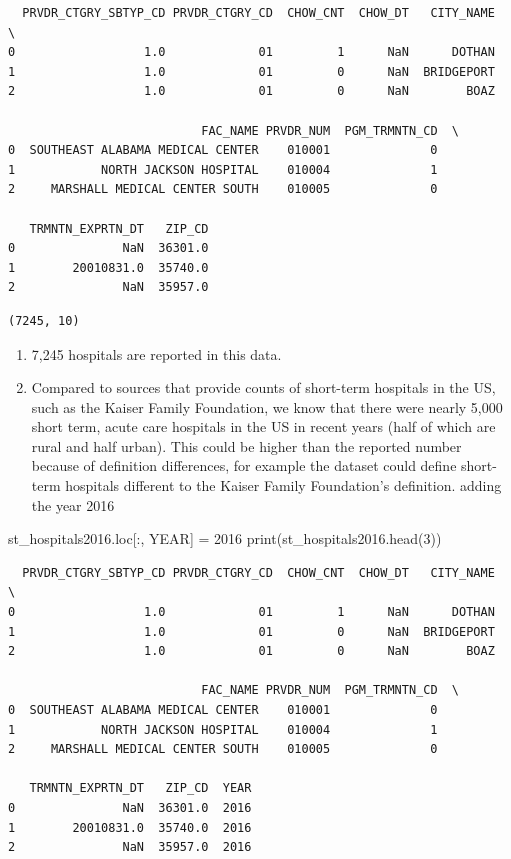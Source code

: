 \documentclass[
  letterpaper,
  DIV=11,
  numbers=noendperiod]{scrartcl}
\newenvironment{Shaded}{\begin{snugshade}}{\end{snugshade}}
\newcommand{\BuiltInTok}[1]{\textcolor[rgb]{0.00,0.23,0.31}{#1}}
\newcommand{\DecValTok}[1]{\textcolor[rgb]{0.68,0.00,0.00}{#1}}
\newcommand{\NormalTok}[1]{\textcolor[rgb]{0.00,0.23,0.31}{#1}}
\newcommand{\OperatorTok}[1]{\textcolor[rgb]{0.37,0.37,0.37}{#1}}
\newcommand{\StringTok}[1]{\textcolor[rgb]{0.13,0.47,0.30}{#1}}
\providecommand{\tightlist}{%
  \setlength{\itemsep}{0pt}\setlength{\parskip}{0pt}}\usepackage{longtable,booktabs,array}
\begin{document}
\begin{verbatim}
  PRVDR_CTGRY_SBTYP_CD PRVDR_CTGRY_CD  CHOW_CNT  CHOW_DT   CITY_NAME  \
0                  1.0             01         1      NaN      DOTHAN   
1                  1.0             01         0      NaN  BRIDGEPORT   
2                  1.0             01         0      NaN        BOAZ   

                           FAC_NAME PRVDR_NUM  PGM_TRMNTN_CD  \
0  SOUTHEAST ALABAMA MEDICAL CENTER    010001              0   
1            NORTH JACKSON HOSPITAL    010004              1   
2     MARSHALL MEDICAL CENTER SOUTH    010005              0   

   TRMNTN_EXPRTN_DT   ZIP_CD  
0               NaN  36301.0  
1        20010831.0  35740.0  
2               NaN  35957.0  
\end{verbatim}

\begin{verbatim}
(7245, 10)
\end{verbatim}

\begin{enumerate}
\def\labelenumi{\alph{enumi}.}
\tightlist
\item
  7,245 hospitals are reported in this data.
\item
  Compared to sources that provide counts of short-term hospitals in the
  US, such as the Kaiser Family Foundation, we know that there were
  nearly 5,000 short term, acute care hospitals in the US in recent
  years (half of which are rural and half urban). This could be higher
  than the reported number because of definition differences, for
  example the dataset could define short-term hospitals different to the
  Kaiser Family Foundation's definition. adding the year 2016
\end{enumerate}

\begin{Shaded}
\begin{Highlighting}[]
\NormalTok{st\_hospitals2016.loc[:, }\StringTok{\textquotesingle{}YEAR\textquotesingle{}}\NormalTok{] }\OperatorTok{=} \DecValTok{2016}
\BuiltInTok{print}\NormalTok{(st\_hospitals2016.head(}\DecValTok{3}\NormalTok{))}
\end{Highlighting}
\end{Shaded}

\begin{verbatim}
  PRVDR_CTGRY_SBTYP_CD PRVDR_CTGRY_CD  CHOW_CNT  CHOW_DT   CITY_NAME  \
0                  1.0             01         1      NaN      DOTHAN   
1                  1.0             01         0      NaN  BRIDGEPORT   
2                  1.0             01         0      NaN        BOAZ   

                           FAC_NAME PRVDR_NUM  PGM_TRMNTN_CD  \
0  SOUTHEAST ALABAMA MEDICAL CENTER    010001              0   
1            NORTH JACKSON HOSPITAL    010004              1   
2     MARSHALL MEDICAL CENTER SOUTH    010005              0   

   TRMNTN_EXPRTN_DT   ZIP_CD  YEAR  
0               NaN  36301.0  2016  
1        20010831.0  35740.0  2016  
2               NaN  35957.0  2016  
\end{verbatim}
\end{document}
